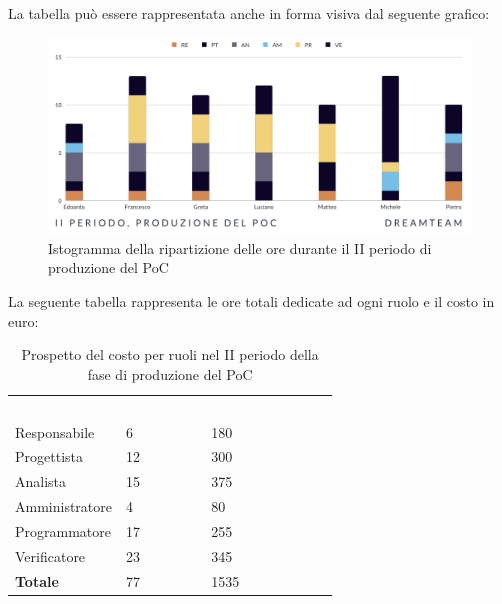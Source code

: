 La tabella può essere rappresentata anche in forma visiva dal seguente grafico:
\begin{figure}[!h]
\centering
\includegraphics[scale=0.65]{Sezioni/SezioniPreventivo/grafici/Poc_II_periodo.png}
\caption{Istogramma della ripartizione delle ore durante il II periodo di produzione del PoC}
\end{figure}

La seguente tabella rappresenta le ore totali dedicate ad ogni ruolo e il costo in euro:

\begin{table}[!htbp]
\begin{center}
\renewcommand{\arraystretch}{1.5}
\begin{tabular}{ m{}<{\centering}  m{}<{\centering} m{}<{\centering}}
	\rowcolor{darkblue}
	\textcolor{white}{\textbf{Ruolo}}&\textcolor{white}{\textbf{Totale ore}}&\textcolor{white}{\textbf{Costo totale (\euro)}}\\ 

	Responsabile  & 6 & 180 \\	
	
	Progettista & 12 & 300 \\
	
	Analista & 15 & 375 \\

	Amministratore & 4 & 80 \\
	
	Programmatore & 17 & 255 \\
	
	Verificatore & 23 & 345 \\
	
	\textbf{Totale} & 77 & 1535 \\
	
\end{tabular}
\caption{Prospetto del costo per ruoli nel II periodo della fase di produzione del PoC}
\end{center}
\end{table}

